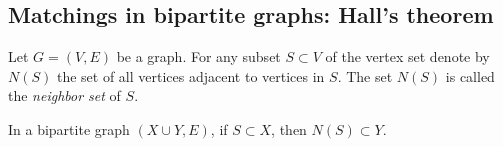 \begin{page}
\setcounter{section}{4}
\setcounter{subsection}{4}
\setcounter{dfn}{5}
\label{portion:387}

% 




\end{page}

\begin{page}
\setcounter{section}{4}
\setcounter{subsection}{4}
\setcounter{dfn}{5}
\label{portion:389}

\subsection{Matchings in bipartite graphs: Hall's theorem}

\end{page}

\begin{page}
\setcounter{section}{4}
\setcounter{subsection}{4}
\setcounter{dfn}{6}
\label{portion:391}

\begin{dfn}
Let $G = (V, E)$ be a graph.
For any subset $S \subset V$ of the vertex set denote by $N(S)$ the set of all vertices adjacent to vertices in $S$.
The set $N(S)$ is called the \emph{neighbor set} of $S$.
\end{dfn}

\end{page}

\begin{page}
\setcounter{section}{4}
\setcounter{subsection}{4}
\setcounter{dfn}{6}
\label{portion:392}


In a bipartite graph $(X \cup Y, E)$, if $S \subset X$, then $N(S) \subset Y$.



\end{page}

